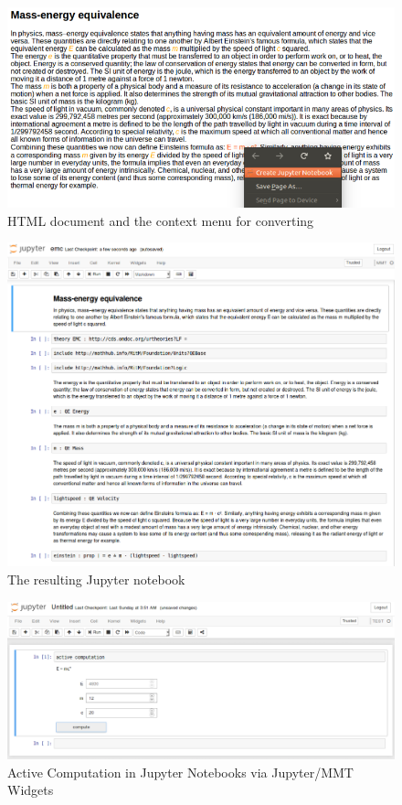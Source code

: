 
\begin{figure}[ht]\centering
\includegraphics[width=12cm]{conversionHTML}
\caption{HTML document and the context menu for converting}
\label{fig:conversionHTML}
\end{figure}

\begin{figure}[ht]\centering
\includegraphics[width=12cm]{conversionNotebook}
\caption{The resulting Jupyter notebook}
\label{fig:conversionNotebook}
\end{figure}

\begin{figure}[ht]\centering
    \includegraphics[width=12cm]{activecomp}
    \caption{Active Computation in Jupyter Notebooks via Jupyter/MMT Widgets}\label{fig:ac}
  \end{figure}


